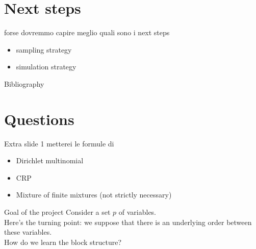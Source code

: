 \section{Next steps}
\begin{frame}

forse dovremmo capire meglio quali sono i next steps

\begin{itemize}
    \item sampling strategy
    \item simulation strategy
\end{itemize}



\centering \Huge 
\end{frame}




\begin{frame}{Bibliography}
    \nocite{bensonAdaptiveMCMCMultiple2018}
    \nocite{martinezNonparametricChangePoint2014}
    \renewcommand*{\bibfont}{\tiny}
    \printbibliography
\end{frame}

\section*{Questions}


\begin{frame}{Extra slide 1}
metterei le formule di 
\begin{itemize}
    \item Dirichlet multinomial
    \item CRP
    \item Mixture of finite mixtures (not strictly necessary)

    

\end{itemize} 
\end{frame}




\begin{frame}
    {Goal of the project}
    Consider a set $p$ of variables.\\
    Here's the turning point: we suppose that there is an underlying order between these variables.\\
    How do we learn the block structure?
\end{frame}


